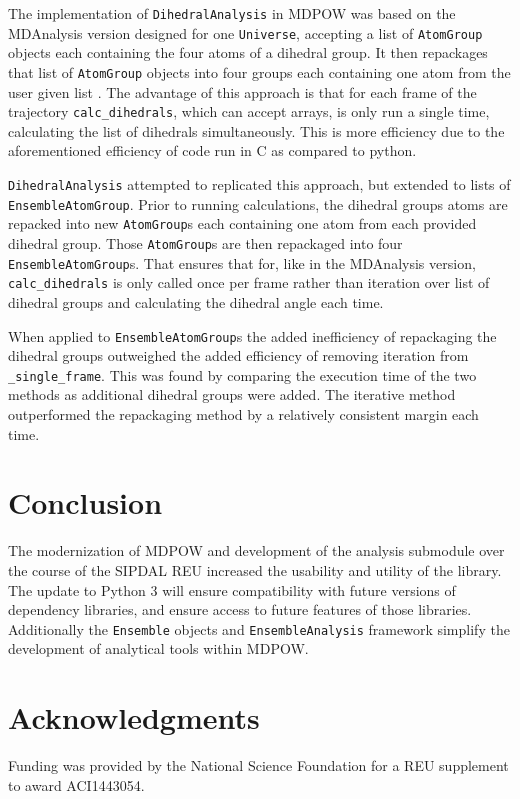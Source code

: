 \documentclass{article}[letterpaper, margins=1in, 12pt]
\begin{document}
The implementation of \texttt{DihedralAnalysis} in MDPOW was based on the MDAnalysis version designed for one \texttt{Universe}, accepting a list of \texttt{AtomGroup} objects each containing the four atoms of a dihedral group. It then repackages that list of \texttt{AtomGroup} objects into four groups each containing one atom from the user given list \cite{Mull2018}. The advantage of this approach is that for each frame of the trajectory \lstinline{calc_dihedrals}, which can accept arrays, is only run a single time, calculating the list of dihedrals simultaneously. This is more efficiency due to the aforementioned efficiency of code run in C as compared to python.

\texttt{DihedralAnalysis} attempted to replicated this approach, but extended to lists of \texttt{EnsembleAtomGroup}. Prior to running calculations, the dihedral groups atoms are repacked into new \texttt{AtomGroup}s each containing one atom from each provided dihedral group. Those \texttt{AtomGroup}s are then repackaged into four \texttt{EnsembleAtomGroup}s. That ensures that for, like in the MDAnalysis version, \lstinline{calc_dihedrals} is only called once per frame rather than iteration over list of dihedral groups and calculating the dihedral angle each time.

When applied to \texttt{EnsembleAtomGroup}s the added inefficiency of repackaging the dihedral groups outweighed the added efficiency of removing iteration from \lstinline{_single_frame}. This was found by comparing the execution time of the two methods as additional dihedral groups were added. The iterative method outperformed the repackaging method by a relatively consistent margin each time.

\section{Conclusion}
The modernization of MDPOW and development of the analysis submodule over the course of the SIPDAL REU increased the usability and utility of the library. The update to Python 3 will ensure compatibility with future versions of dependency libraries, and ensure access to future features of those libraries. Additionally the \texttt{Ensemble} objects and \texttt{EnsembleAnalysis} framework simplify the development of analytical tools within MDPOW.

\section*{Acknowledgments}
Funding was provided by the National Science Foundation for a REU supplement to award ACI1443054. 

\printbibliography
\end{document}
